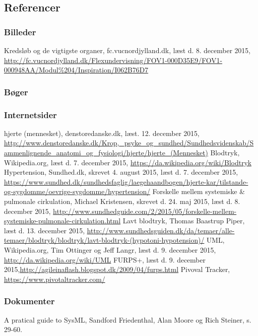 \begin{thebibliography}{99}
\section{Referencer}
\subsubsection{Billeder}
Kredsløb og de vigtigste organer, fc.vucnordjylland.dk, læst d. 8. december 2015, \url{http://fc.vucnordjylland.dk/Flexundervisning/FOV1-000D35E9/FOV1-000948AA/Modul\%204/Inspiration/I062B76D7}
\subsubsection{Bøger}

\subsubsection{Internetsider}
hjerte (mennesket), denstoredanske.dk, læst. 12. december 2015, \url{http://www.denstoredanske.dk/Krop,_psyke_og_sundhed/Sundhedsvidenskab/Sammenlignende_anatomi_og_fysiologi/hjerte/hjerte_(Mennesket)}
Blodtryk, Wikipedia.org, læst d. 7. december 2015, \url{https://da.wikipedia.org/wiki/Blodtryk}
Hypertension, Sundhed.dk, skrevet 4. august 2015, læst d. 7. december 2015,
\url{https://www.sundhed.dk/sundhedsfaglig/laegehaandbogen/hjerte-kar/tilstande-og-sygdomme/oevrige-sygdomme/hypertension/}
Forskelle mellem systemiske \& pulmonale cirkulation, Michael Kristensen, skrevet d. 24. maj 2015, læst d. 8. december 2015, \url{http://www.sundhedguide.com/2/2015/05/forskelle-mellem-systemiske-pulmonale-cirkulation.html}
Lavt blodtryk, Thomas Baastrup Piper, læst d. 13. december 2015, \url{http://www.sundhedsguiden.dk/da/temaer/alle-temaer/blodtryk/blodtryk/lavt-blodtryk-(hypotoni-hypotension)/}
UML, Wikipedia.org, Tim Ottinger og Jeff Langr, læst d. 9. december 2015, \url{http://da.wikipedia.org/wiki/UML}
FURPS+, læst d. 9. december 2015,\url{http://agileinaflash.blogspot.dk/2009/04/furps.html}
Pivoval Tracker, \url{https://www.pivotaltracker.com/}
\subsubsection{Dokumenter}
A pratical guide to SysML, Sandford Friedenthal, Alan Moore og Rich Steiner, s. 29-60.
\end{thebibliography}